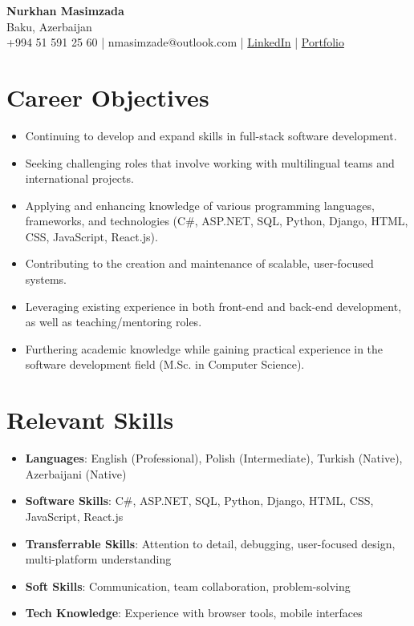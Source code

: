 \documentclass[11pt,a4paper]{article}
\begin{document}
\begin{center}
    {\Large \textbf{Nurkhan Masimzada}} \\
    Baku, Azerbaijan \\
    +994 51 591 25 60 | nmasimzade@outlook.com | \href{https://www.linkedin.com/in/nurkhan-masimzada-123456789/}{LinkedIn} | \href{https://nurkhanmasimzada.site}{Portfolio}
\end{center}

\section*{Career Objectives}
\begin{itemize}[leftmargin=*]
    \item Continuing to develop and expand skills in full-stack software development.
    \item Seeking challenging roles that involve working with multilingual teams and international projects.
    \item Applying and enhancing knowledge of various programming languages, frameworks, and technologies (C\#, ASP.NET, SQL, Python, Django, HTML, CSS, JavaScript, React.js).
    \item Contributing to the creation and maintenance of scalable, user-focused systems.
    \item Leveraging existing experience in both front-end and back-end development, as well as teaching/mentoring roles.
    \item Furthering academic knowledge while gaining practical experience in the software development field (M.Sc. in Computer Science).
\end{itemize}

\section*{Relevant Skills}
\begin{itemize}[leftmargin=*]
    \item \textbf{Languages}: English (Professional), Polish (Intermediate), Turkish (Native),  Azerbaijani (Native)
    \item \textbf{Software Skills}: C\#, ASP.NET, SQL, Python, Django, HTML, CSS, JavaScript, React.js
    \item \textbf{Transferrable Skills}: Attention to detail, debugging, user-focused design, multi-platform understanding
    \item \textbf{Soft Skills}: Communication, team collaboration, problem-solving
    \item \textbf{Tech Knowledge}: Experience with browser tools, mobile interfaces
\end{itemize}
\end{document}

